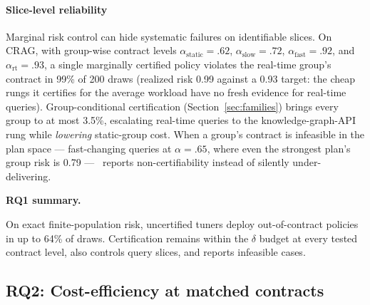 \paragraph{Slice-level reliability}
Marginal risk control can hide systematic failures on identifiable
slices. On CRAG, with group-wise contract levels
$\alpha_{\mathrm{static}} = .62$, $\alpha_{\mathrm{slow}} = .72$,
$\alpha_{\mathrm{fast}} = .92$, and $\alpha_{\mathrm{rt}} = .93$, a
single marginally certified policy violates the real-time group's
contract in 99\% of 200 draws (realized risk 0.99 against a 0.93
target: the cheap rungs it certifies for the average workload have no
fresh evidence for real-time queries). Group-conditional certification
(Section~\ref{sec:families}) brings every group to at most 3.5\%,
escalating real-time queries to the knowledge-graph-API rung while
\emph{lowering} static-group cost. When a group's contract is
infeasible in the plan space --- fast-changing queries at
$\alpha = .65$, where even the strongest plan's group risk is 0.79 ---
\system\ reports non-certifiability instead of silently
under-delivering.

\smallskip\noindent\textbf{RQ1 summary.}\par
On exact finite-population risk, uncertified tuners deploy
out-of-contract policies in up to 64\% of draws. Certification remains
within the $\delta$ budget at every tested contract level, also controls
query slices, and reports infeasible cases.

\subsection{RQ2: Cost-efficiency at matched contracts}
\label{sec:exp-cost}

